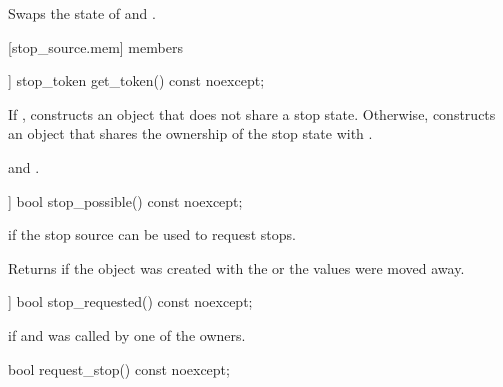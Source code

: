 {\begin{itemdescr}
 \pnum \effects Swaps the state of  and .
\end{itemdescr}


[stop_source.mem]{ members}

%
\begin{itemdecl}
[[nodiscard]] stop_token get_token() const noexcept;
\end{itemdecl}
\begin{itemdescr}
  \pnum\effects If , constructs an  object
                that does not share a stop state.
                Otherwise, constructs an  object 
                that shares the ownership of the stop state with .

  \pnum\postconditions {}
                and .
\end{itemdescr}


%
\begin{itemdecl}
[[nodiscard]] bool stop_possible() const noexcept;
\end{itemdecl}
\begin{itemdescr}
  \pnum\returns {} if the stop source can be used to request stops.
                \begin{note} Returns  if the object was created with the 
                             or the values were moved away.
                             \end{note}
\end{itemdescr}

%
\begin{itemdecl}
[[nodiscard]] bool stop_requested() const noexcept;
\end{itemdecl}
\begin{itemdescr}
  \pnum\returns {} if  
                and  was called by one of the owners.
\end{itemdescr}

%
\begin{itemdecl}
bool request_stop() const noexcept;
\end{itemdecl}
\begin{itemdescr}


\end{itemdescr}}
